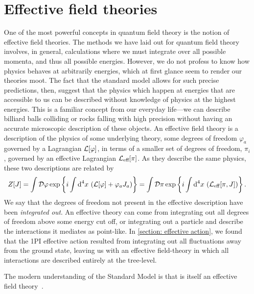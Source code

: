\section{Effective field theories}


One of the most powerful concepts in quantum field theory is the notion of effective field theories.
The methods we have laid out for quantum field theory involves, in general, calculations where we must integrate over all possible momenta, and thus all possible energies.
However, we do not profess to know how physics behaves at arbitrarily energies, which at first glance seem to render our theories moot.
The fact that the standard model allows for such precise predictions, then, suggest that the physics which happen at energies that are accessible to us can be described without knowledge of physics at the highest energies.
This is a familiar concept from our everyday life---we can describe billiard balls colliding or rocks falling with high precision without having an accurate microscopic description of these objects.
An effective field theory is a description of the physics of some underlying theory, some degrees of freedom $\varphi_a$ governed by a Lagrangian $\mathcal{L}[\varphi]$, in terms of a smaller set of degrees of freedom, $\pi_i$, governed by an effective Lagrangian $\mathcal{L}_\text{eff}[\pi]$.
As they describe the same physics, these two descriptions are related by 
%
\begin{equation}
    Z[J] = \int \mathcal D \varphi \, \text{exp} \left\{ i\int \text{d}^4 x \, \left( \mathcal{L}[\varphi] + \varphi_a J_a \right) \right\}
    = \int \mathcal D \pi\, \text{exp} \left\{ i\int \text{d}^4 x \, \left( \mathcal{L}_\text{eff}[\pi, J]\right) \right\}.
\end{equation}
%
We say that the degrees of freedom not present in the effective description have been \emph{integrated out}.
An effective theory can come from integrating out all degrees of freedom above some energy cut off, or integrating out a particle and describe the interactions it mediates as point-like.
In \autoref{section: effective action}, we found that the 1PI effective action resulted from integrating out all fluctuations away from the ground state, leaving us with an effective field-theory in which all interactions are described entirely at the tree-level.

The modern understanding of the Standard Model is that is itself an effective field theory~\autocite{pencoIntroductionEffectiveField2020}.


